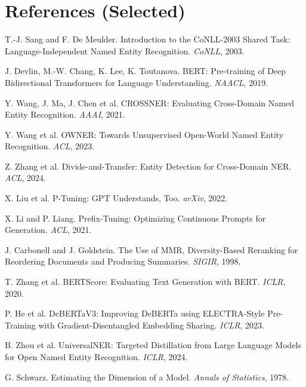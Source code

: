 \documentclass[11pt,a4paper]{article}
\begin{document}
\section*{References (Selected)}

\begin{enumerate}[label={[\arabic*]},noitemsep,leftmargin=2em]
  \item T.-J. Sang and F. De Meulder. Introduction to the CoNLL-2003 Shared Task: Language-Independent Named Entity Recognition. \textit{CoNLL}, 2003.
  \item J. Devlin, M.-W. Chang, K. Lee, K. Toutanova. BERT: Pre-training of Deep Bidirectional Transformers for Language Understanding. \textit{NAACL}, 2019.
  \item Y. Wang, J. Ma, J. Chen et al. CROSSNER: Evaluating Cross-Domain Named Entity Recognition. \textit{AAAI}, 2021.
  \item Y. Wang et al. OWNER: Towards Unsupervised Open-World Named Entity Recognition. \textit{ACL}, 2023.
  \item Z. Zhang et al. Divide-and-Transfer: Entity Detection for Cross-Domain NER. \textit{ACL}, 2024.
  \item X. Liu et al. P-Tuning: GPT Understands, Too. \textit{arXiv}, 2022.
  \item X. Li and P. Liang. Prefix-Tuning: Optimizing Continuous Prompts for Generation. \textit{ACL}, 2021.
  \item J. Carbonell and J. Goldstein. The Use of MMR, Diversity-Based Reranking for Reordering Documents and Producing Summaries. \textit{SIGIR}, 1998.
  \item T. Zhang et al. BERTScore: Evaluating Text Generation with BERT. \textit{ICLR}, 2020.
  \item P. He et al. DeBERTaV3: Improving DeBERTa using ELECTRA-Style Pre-Training with Gradient-Disentangled Embedding Sharing. \textit{ICLR}, 2023.
  \item B. Zhou et al. UniversalNER: Targeted Distillation from Large Language Models for Open Named Entity Recognition. \textit{ICLR}, 2024.
  \item G. Schwarz. Estimating the Dimension of a Model. \textit{Annals of Statistics}, 1978.
\end{enumerate}
\end{document}
